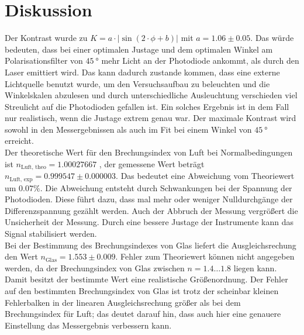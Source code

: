 \section{Diskussion}

Der Kontrast wurde zu $K = a \cdot | \sin (2 \cdot \phi + b) |$ mit $a = 1.06 \pm 0.05$. Das würde
bedeuten, dass bei einer optimalen Justage und dem optimalen Winkel am Polarisationsfilter von
$\SI{45}{\degree}$ mehr Licht an der Photodiode ankommt, als durch den Laser emittiert wird. Das kann
dadurch zustande kommen, dass eine externe Lichtquelle benutzt wurde, um den Versuchsaufbau zu beleuchten
und die Winkelskalen abzulesen und durch unterschiedliche Ausleuchtung verschieden viel Streulicht
auf die Photodioden gefallen ist. Ein solches Ergebnis ist in dem Fall nur realistisch, wenn die
Justage extrem genau war. Der maximale Kontrast wird sowohl in den Messergebnissen als auch im Fit bei
einem Winkel von $\SI{45}{\degree}$ erreicht.\\
\newline
Der theoretische Wert für den Brechungsindex von Luft bei Normalbedingungen ist
$n_\text{Luft, theo} = 1.00027667$ \cite{n}, der gemessene Wert beträgt
$n_\text{Luft, exp} = 0.999547 \pm 0.000003$. Das bedeutet eine Abweichung vom Theoriewert um
$0.07\%$. Die Abweichung entsteht durch Schwankungen bei der Spannung der Photodioden. Diese führt
dazu, dass mal mehr oder weniger Nulldurchgänge der Differenzspannung gezählt werden. Auch der Abbruch
der Messung vergrößert die Unsicherheit der Messung. Durch eine bessere Justage der Instrumente kann
das Signal stabilisiert werden.\\
\newline
Bei der Bestimmung des Brechungsindexes von Glas liefert die Ausgleichsrechung den Wert
$n_\text{Glas} = 1.553 \pm 0.009$. Fehler zum Theoriewert können nicht angegeben werden, da der
Brechungsindex von Glas zwischen $n = 1.4 \dots 1.8$ \cite{n} liegen kann. Damit besitzt der bestimmte
Wert eine realistische Größenordnung. Der Fehler auf den bestimmten Brechungsindex von Glas ist trotz
der scheinbar kleinen Fehlerbalken in der linearen Ausgleichsrechung größer als bei dem Brechungsindex
für Luft; das deutet darauf hin, dass auch hier eine genauere Einstellung das Messergebnis verbessern
kann.

\printbibliography
